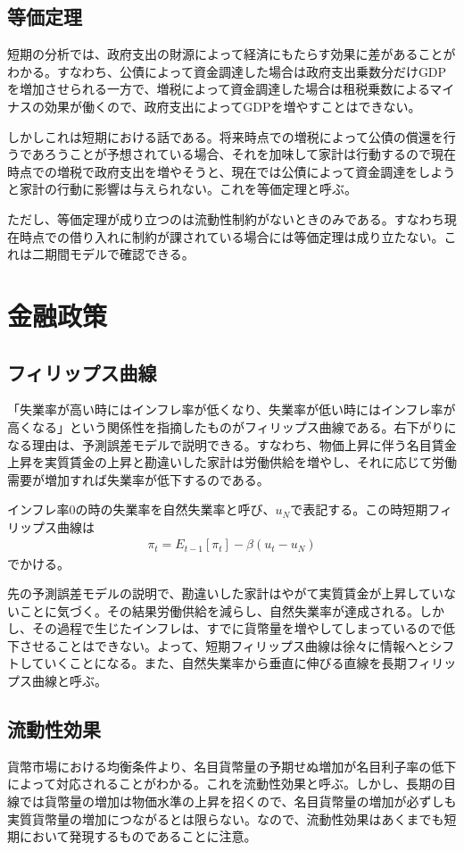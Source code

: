 \documentclass{jsarticle}
\begin{document}
\subsection{等価定理}
短期の分析では、政府支出の財源によって経済にもたらす効果に差があることがわかる。すなわち、公債によって資金調達した場合は政府支出乗数分だけGDPを増加させられる一方で、増税によって資金調達した場合は租税乗数によるマイナスの効果が働くので、政府支出によってGDPを増やすことはできない。

しかしこれは短期における話である。将来時点での増税によって公債の償還を行うであろうことが予想されている場合、それを加味して家計は行動するので現在時点での増税で政府支出を増やそうと、現在では公債によって資金調達をしようと家計の行動に影響は与えられない。これを等価定理と呼ぶ。

ただし、等価定理が成り立つのは流動性制約がないときのみである。すなわち現在時点での借り入れに制約が課されている場合には等価定理は成り立たない。これは二期間モデルで確認できる。

\section{金融政策}
\subsection{フィリップス曲線}
「失業率が高い時にはインフレ率が低くなり、失業率が低い時にはインフレ率が高くなる」という関係性を指摘したものがフィリップス曲線である。右下がりになる理由は、予測誤差モデルで説明できる。すなわち、物価上昇に伴う名目賃金上昇を実質賃金の上昇と勘違いした家計は労働供給を増やし、それに応じて労働需要が増加すれば失業率が低下するのである。

インフレ率0の時の失業率を自然失業率と呼び、$u_N$で表記する。この時短期フィリップス曲線は
\begin{align*}
	\pi_t = E_{t-1}[\pi_t] - \beta (u_t - u_N)
\end{align*}
でかける。

先の予測誤差モデルの説明で、勘違いした家計はやがて実質賃金が上昇していないことに気づく。その結果労働供給を減らし、自然失業率が達成される。しかし、その過程で生じたインフレは、すでに貨幣量を増やしてしまっているので低下させることはできない。よって、短期フィリップス曲線は徐々に情報へとシフトしていくことになる。また、自然失業率から垂直に伸びる直線を長期フィリップス曲線と呼ぶ。

\subsection{流動性効果}
貨幣市場における均衡条件より、名目貨幣量の予期せぬ増加が名目利子率の低下によって対応されることがわかる。これを流動性効果と呼ぶ。しかし、長期の目線では貨幣量の増加は物価水準の上昇を招くので、名目貨幣量の増加が必ずしも実質貨幣量の増加につながるとは限らない。なので、流動性効果はあくまでも短期において発現するものであることに注意。
\end{document}
